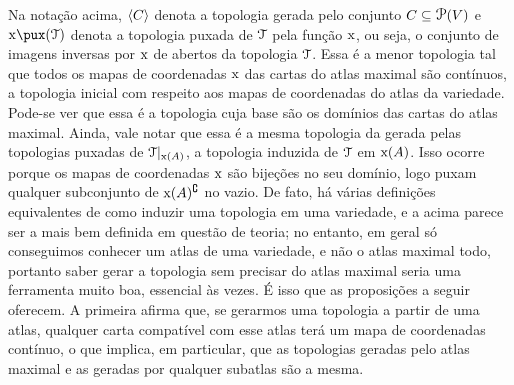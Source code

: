 Na notação acima, $\left\langle C \right\rangle$ denota a topologia gerada pelo conjunto $C \subseteq \p(V)$ e $\x\pux(\topo)$ denota a topologia puxada de $\mathcal{T}$ pela função $\mathrm{x}$, ou seja, o conjunto de imagens inversas por $\mathrm{x}$ de abertos da topologia $\mathcal{T}$. Essa é a menor topologia tal que todos os mapas de coordenadas $\mathrm{x}$ das cartas do atlas maximal são contínuos, a topologia inicial com respeito aos mapas de coordenadas do atlas da variedade. Pode-se ver que essa é a topologia cuja base são os domínios das cartas do atlas maximal. Ainda, vale notar que essa é a mesma topologia da gerada pelas topologias puxadas de $\mathcal{T}|_{\mathrm{x}(A)}$, a topologia induzida de $\mathcal{T}$ em $\mathrm{x}(A)$. Isso ocorre porque os mapas de coordenadas $\mathrm{x}$ são bijeções no seu domínio, logo puxam qualquer subconjunto de $\mathrm{x}(A)^\complement$ no vazio. De fato, há várias definições equivalentes de como induzir uma topologia em uma variedade, e a acima parece ser a mais bem definida em questão de teoria; no entanto, em geral só conseguimos conhecer um atlas de uma variedade, e não o atlas maximal todo, portanto saber gerar a topologia sem precisar do atlas maximal seria uma ferramenta muito boa, essencial às vezes. É isso que as proposições a seguir oferecem. A primeira afirma que, se gerarmos uma topologia a partir de uma atlas, qualquer carta compatível com esse atlas terá um mapa de coordenadas contínuo, o que implica, em particular, que as topologias geradas pelo atlas maximal e as geradas por qualquer subatlas são a mesma.

